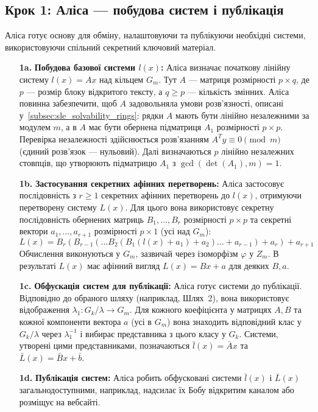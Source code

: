 \subsection{Крок 1: Аліса — побудова систем і публікація}
\label{subsec:protocol_step1_alice}
Аліса готує основу для обміну, налаштовуючи та публікуючи необхідні системи, використовуючи спільний секретний ключовий матеріал.
\begin{enumerate}
    \item[\textbf{1a.}] \textbf{Побудова базової системи $l(x)$:} Аліса визначає початкову лінійну систему $l(x) = Ax$ над кільцем $G_m$.
    Тут $A$ — матриця розмірності $p \times q$, де $p$ — розмір блоку відкритого тексту, а $q \geq p$ — кількість змінних.
    Аліса повинна забезпечити, щоб $A$ задовольняла умови розв'язності, описані у~\ref{subsec:sle_solvability_rings}: рядки $A$ мають бути лінійно незалежними за модулем $m$, а в $A$ має бути обернена підматриця $A_1$ розмірності $p \times p$.
    Перевірка незалежності здійснюється розв'язанням $A^T y \equiv 0 \pmod{m}$ (єдиний розв'язок — нульовий).
    Далі визначаються $p$ лінійно незалежних стовпців, що утворюють підматрицю $A_1$ з $\gcd(\det(A_1), m) = 1$.
    \item[\textbf{1b.}] \textbf{Застосування секретних афінних перетворень:} Аліса застосовує послідовність з $r \geq 1$ секретних афінних перетворень до $l(x)$, отримуючи перетворену систему $L(x)$.
    Для цього вона використовує секретну послідовність обернених матриць $B_1, \ldots, B_r$ розмірності $p \times p$ та секретні вектори $a_1, \ldots, a_{r+1}$ розмірності $p \times 1$ (усі над $G_m$):
    \[
        L(x) = B_r(B_{r-1}(\ldots B_2(B_1(l(x)+a_1)+a_2)\ldots + a_{r-1})+a_r)+a_{r+1}
    \]
    Обчислення виконуються у $G_m$, зазвичай через ізоморфізм $\varphi$ у $Z_m$.
    В результаті $L(x)$ має афінний вигляд $L(x) = Bx + a$ для деяких $B, a$.
    \item[\textbf{1c.}] \textbf{Обфускація систем для публікації:} Аліса готує системи до публікації.
    Відповідно до обраного шляху (наприклад, Шлях~2), вона використовує відображення $\lambda_1: G_k/\lambda \to G_m$.
    Для кожного коефіцієнта у матрицях $A, B$ та кожної компоненти вектора $a$ (усі в $G_m$) вона знаходить відповідний клас у $G_k/\lambda$ через $\lambda_1^{-1}$ і вибирає представника з цього класу у $G_k$.
    Системи, утворені цими представниками, позначаються $\bar{l}(x) = \bar{A}x$ та $\bar{L}(x) = \bar{B}x + \bar{b}$.
    \item[\textbf{1d.}] \textbf{Публікація систем:} Аліса робить обфусковані системи $\bar{l}(x)$ і $\bar{L}(x)$ загальнодоступними, наприклад, надсилає їх Бобу відкритим каналом або розміщує на вебсайті.
\end{enumerate}

